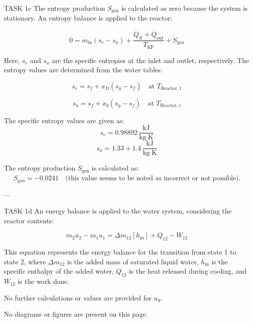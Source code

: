 TASK 1c  
The entropy production \( \dot{S}_{\text{gen}} \) is calculated as zero because the system is stationary. An entropy balance is applied to the reactor:  

\[
0 = \dot{m}_{\text{in}} (s_e - s_a) + \frac{\dot{Q}_R + \dot{Q}_{\text{out}}}{T_{\text{KF}}} + \dot{S}_{\text{gen}}
\]

Here, \( s_e \) and \( s_a \) are the specific entropies at the inlet and outlet, respectively. The entropy values are determined from the water tables:  

\[
s_e = s_f + x_D (s_g - s_f) \quad \text{at } T_{\text{Reactor},1}
\]

\[
s_a = s_f + x_0 (s_g - s_f) \quad \text{at } T_{\text{Reactor},1}
\]

The specific entropy values are given as:  
\[
s_e = 0.98892 \, \frac{\text{kJ}}{\text{kg·K}}
\]
\[
s_a = 1.33 + 1.4 \, \frac{\text{kJ}}{\text{kg·K}}
\]

The entropy production \( \dot{S}_{\text{gen}} \) is calculated as:  
\[
\dot{S}_{\text{gen}} = -0.0241 \quad \text{(this value seems to be noted as incorrect or not possible).}
\]

---

TASK 1d  
An energy balance is applied to the water system, considering the reactor contents:  

\[
m_{2} u_{2} - m_{1} u_{1} = \Delta m_{12} [h_{\text{in}}] + Q_{12} - W_{12}
\]

This equation represents the energy balance for the transition from state 1 to state 2, where \( \Delta m_{12} \) is the added mass of saturated liquid water, \( h_{\text{in}} \) is the specific enthalpy of the added water, \( Q_{12} \) is the heat released during cooling, and \( W_{12} \) is the work done.  

No further calculations or values are provided for \( u_d \).  

No diagrams or figures are present on this page.